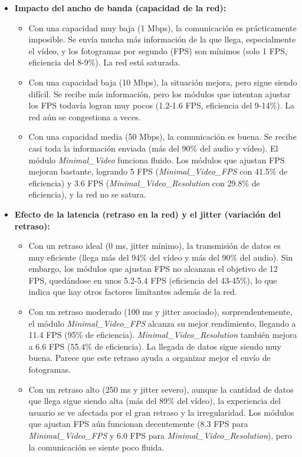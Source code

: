\begin{itemize}
\item \textbf{Impacto del ancho de banda (capacidad de la red):}
\begin{itemize}
\item Con una capacidad muy baja (1 Mbps), la comunicación es prácticamente imposible. Se envía mucha más información de la que llega, especialmente el vídeo, y los fotogramas por segundo (FPS) son mínimos (solo 1 FPS, eficiencia del 8-9\%). La red está saturada.
\item Con una capacidad baja (10 Mbps), la situación mejora, pero sigue siendo difícil. Se recibe más información, pero los módulos que intentan ajustar los FPS todavía logran muy pocos (1.2-1.6 FPS, eficiencia del 9-14\%). La red aún se congestiona a veces.
\item Con una capacidad media (50 Mbps), la comunicación es buena. Se recibe casi toda la información enviada (más del 90\% del audio y vídeo). El módulo \textit{Minimal\_Video} funciona fluido. Los módulos que ajustan FPS mejoran bastante, logrando 5 FPS (\textit{Minimal\_Video\_FPS} con 41.5\% de eficiencia) y 3.6 FPS (\textit{Minimal\_Video\_Resolution} con 29.8\% de eficiencia), y la red no se satura.
\end{itemize}
\item \textbf{Efecto de la latencia (retraso en la red) y el jitter (variación del retraso):}
\begin{itemize}
    \item Con un retraso ideal (0 ms, jitter mínimo), la transmisión de datos es muy eficiente (llega más del 94\% del vídeo y más del 90\% del audio). Sin embargo, los módulos que ajustan FPS no alcanzan el objetivo de 12 FPS, quedándose en unos 5.2-5.4 FPS (eficiencia del 43-45\%), lo que indica que hay otros factores limitantes además de la red.
    \item Con un retraso moderado (100 ms y jitter asociado), sorprendentemente, el módulo \textit{Minimal\_Video\_FPS} alcanza su mejor rendimiento, llegando a 11.4 FPS (95\% de eficiencia). \textit{Minimal\_Video\_Resolution} también mejora a 6.6 FPS (55.4\% de eficiencia). La llegada de datos sigue siendo muy buena. Parece que este retraso ayuda a organizar mejor el envío de fotogramas.
    \item Con un retraso alto (250 ms y jitter severo), aunque la cantidad de datos que llega sigue siendo alta (más del 89\% del vídeo), la experiencia del usuario se ve afectada por el gran retraso y la irregularidad. Los módulos que ajustan FPS aún funcionan decentemente (8.3 FPS para \textit{Minimal\_Video\_FPS} y 6.0 FPS para \textit{Minimal\_Video\_Resolution}), pero la comunicación se siente poco fluida.
\end{itemize}


\end{itemize}
